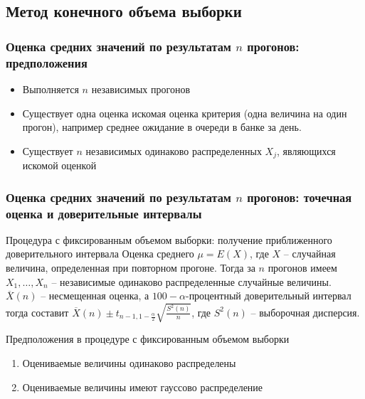 \documentclass[utf8]{beamer}
\begin{document}
\subsection{Метод конечного объема выборки}
\begin{frame}
\frametitle{Оценка средних значений по результатам $n$ прогонов: предположения}
\begin{itemize}
	\item Выполняется $n$ независимых прогонов
	\item Существует одна оценка искомая оценка критерия (одна величина на один прогон), например среднее ожидание в очереди в банке за день.
	\item Существует $n$ независимых одинаково распределенных $X_j$, являющихся искомой оценкой 
\end{itemize}
\end{frame}
\begin{frame}
\frametitle{Оценка средних значений по результатам $n$ прогонов: точечная оценка и доверительные интервалы}
\begin{block}{Процедура с фиксированным объемом выборки: получение приближенного доверительного интервала}
Оценка среднего $\mu = E(X)$, где $X$ -- случайная величина, определенная при повторном прогоне. Тогда за $n$ прогонов имеем $X_1, \ldots, X_n$ -- независимые одинаково распределенные случайные величины. $\overline{X}(n)$ -- несмещенная оценка, а $100-\alpha$-процентный доверительный интервал тогда составит $\overline{X}(n)\pm t_{n-1, 1-\frac{\alpha}{2}} \sqrt{\frac{S^2(n)}{n}}$, где $S^2(n)$ -- выборочная дисперсия.
\end{block}
\begin{block}{Предположения в процедуре с фиксированным объемом выборки}
 \begin{enumerate}
 	\item Оцениваемые величины одинаково распределены
	\item Оцениваемые величины имеют гауссово распределение
\end{enumerate}
\end{block}
\end{frame}
\end{document}
